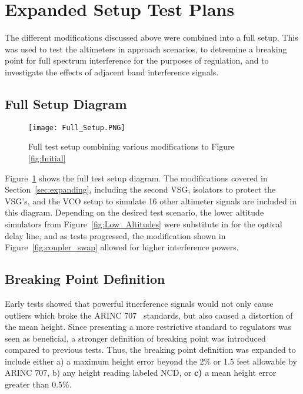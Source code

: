 \section{Expanded Setup Test Plans}
The different modifications discussed above were combined into a full setup. This was used to test the altimeters in approach scenarios, to detremine a breaking point for full spectrum interference for the purposes of regulation, and to investigate the effects of adjacent band interference signals.
\subsection{Full Setup Diagram}
\begin{figure}[ht]
\centering
\texttt{[image: Full\_Setup.PNG]}
\caption{Full test setup combining various modifications to Figure~
\ref{fig:Initial}}

\label{fig:combined}

\end{figure}
Figure~\ref{fig:combined} shows the full test setup diagram. The modifications covered in Section~\ref{sec:expanding}, including the second VSG, isolators to protect the VSG's, and the VCO setup to simulate 16 other altimeter signals are included in this diagram. Depending on the desired test scenario, the lower altitude simulators from Figure~\ref{fig:Low_Altitudes} were substitute in for the optical delay line, and as tests progressed, the modification shown in Figure~\ref{fig:coupler_swap} allowed for higher interference powers. 

\subsection{Breaking Point Definition}\label{sub:break}
Early tests showed that powerful itnerference signals would not only cause outliers which broke the ARINC 707~\cite{noauthor_arinc_2009} standards, but also caused a distortion of the mean height. Since presenting a more restrictive standard to regulators was seen as beneficial, a stronger definition of breaking point was introduced compared to previous tests. Thus, the breaking point definition was expanded to include either a) a maximum height error beyond the 2\% or 1.5 feet allowable by ARINC 707, b) any height reading labeled NCD, or \textbf{c)} a mean height error greater than 0.5\%. 

